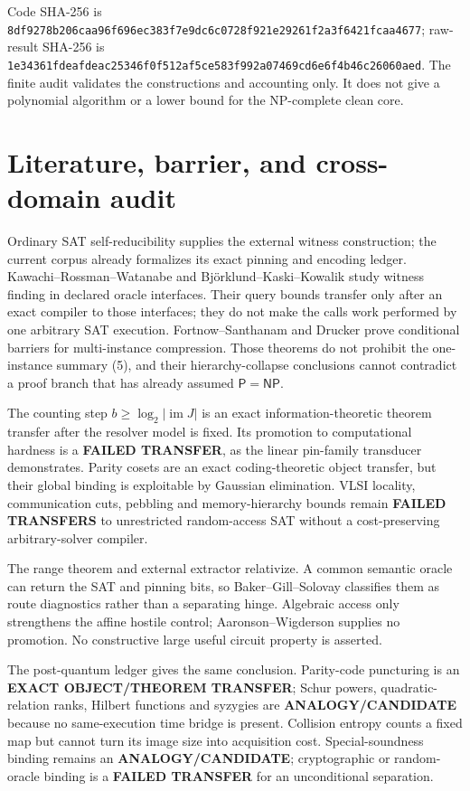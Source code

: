 \documentclass[11pt]{article}
\newcommand{\Pclass}{\mathsf P}
\newcommand{\NPclass}{\mathsf{NP}}
\begin{document}
Code SHA-256 is
\nolinkurl{8df9278b206caa96f696ec383f7e9dc6c0728f921e29261f2a3f6421fcaa4677};
raw-result SHA-256 is
\nolinkurl{1e34361fdeafdeac25346f0f512af5ce583f992a07469cd6e6f4b46c26060aed}.
The finite audit validates the constructions and accounting only.  It does
not give a polynomial algorithm or a lower bound for the NP-complete clean
core.

\section{Literature, barrier, and cross-domain audit}
Ordinary SAT self-reducibility supplies the external witness construction;
the current corpus already formalizes its exact pinning and encoding ledger.
Kawachi--Rossman--Watanabe and Bj\"orklund--Kaski--Kowalik study witness
finding in declared oracle interfaces.  Their query bounds transfer only
after an exact compiler to those interfaces; they do not make the calls work
performed by one arbitrary SAT execution.  Fortnow--Santhanam and Drucker
prove conditional barriers for multi-instance compression.  Those theorems
do not prohibit the one-instance summary (5), and their hierarchy-collapse
conclusions cannot contradict a proof branch that has already assumed
$\Pclass=\NPclass$.

The counting step $b\ge\log_2|\operatorname{im}J|$ is an exact
information-theoretic theorem transfer after the resolver model is fixed.
Its promotion to computational hardness is a \textbf{FAILED TRANSFER}, as
the linear pin-family transducer demonstrates.  Parity cosets are an exact
coding-theoretic object transfer, but their global binding is exploitable by
Gaussian elimination.  VLSI locality, communication cuts, pebbling and
memory-hierarchy bounds remain \textbf{FAILED TRANSFERS} to unrestricted
random-access SAT without a cost-preserving arbitrary-solver compiler.

The range theorem and external extractor relativize.  A common semantic
oracle can return the SAT and pinning bits, so Baker--Gill--Solovay classifies
them as route diagnostics rather than a separating hinge.  Algebraic access
only strengthens the affine hostile control; Aaronson--Wigderson supplies no
promotion.  No constructive large useful circuit property is asserted.

The post-quantum ledger gives the same conclusion.  Parity-code puncturing is
an \textbf{EXACT OBJECT/THEOREM TRANSFER}; Schur powers, quadratic-relation
ranks, Hilbert functions and syzygies are \textbf{ANALOGY/CANDIDATE} because
no same-execution time bridge is present.  Collision entropy counts a fixed
map but cannot turn its image size into acquisition cost.  Special-soundness
binding remains an \textbf{ANALOGY/CANDIDATE}; cryptographic or random-oracle
binding is a \textbf{FAILED TRANSFER} for an unconditional separation.
\end{document}
